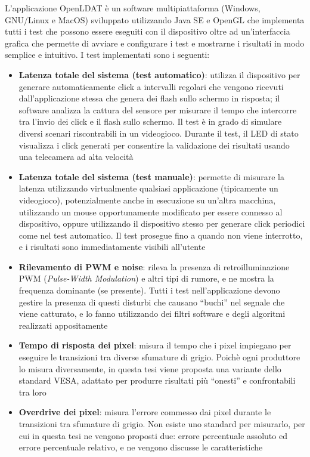 \documentclass[a4paper]{article}
\begin{document}
L'applicazione OpenLDAT è un software multipiattaforma (Windows, GNU/Linux e MacOS) sviluppato utilizzando Java SE e OpenGL che implementa tutti i test che possono essere eseguiti con il dispositivo oltre ad un'interfaccia grafica che permette di avviare e configurare i test e mostrarne i risultati in modo semplice e intuitivo. I test implementati sono i seguenti:\begin{itemize}
	\item \textbf{Latenza totale del sistema (test automatico)}: utilizza il dispositivo per generare automaticamente click a intervalli regolari che vengono ricevuti dall'applicazione stessa che genera dei flash sullo schermo in risposta; il software analizza la cattura del sensore per misurare il tempo che intercorre tra l'invio dei click e il flash sullo schermo. Il test è in grado di simulare diversi scenari riscontrabili in un videogioco. Durante il test, il LED di stato visualizza i click generati per consentire la validazione dei risultati usando una telecamera ad alta velocità
	\item \textbf{Latenza totale del sistema (test manuale)}: permette di misurare la latenza utilizzando virtualmente qualsiasi applicazione (tipicamente un videogioco), potenzialmente anche in esecuzione su un'altra macchina, utilizzando un mouse opportunamente modificato per essere connesso al dispositivo, oppure utilizzando il dispositivo stesso per generare click periodici come nel test automatico. Il test prosegue fino a quando non viene interrotto, e i risultati sono immediatamente visibili all'utente
	\item \textbf{Rilevamento di PWM e noise}: rileva la presenza di retroilluminazione PWM (\textit{Pulse-Width Modulation}) e altri tipi di rumore, e ne mostra la frequenza dominante (se presente). Tutti i test nell'applicazione devono gestire la presenza di questi disturbi che causano ``buchi'' nel segnale che viene catturato, e lo fanno utilizzando dei filtri software e degli algoritmi realizzati appositamente
	\item \textbf{Tempo di risposta dei pixel}: misura il tempo che i pixel impiegano per eseguire le transizioni tra diverse sfumature di grigio. Poichè ogni produttore lo misura diversamente, in questa tesi viene proposta una variante dello standard VESA, adattato per produrre risultati più ``onesti'' e confrontabili tra loro
	\item \textbf{Overdrive dei pixel}: misura l'errore commesso dai pixel durante le transizioni tra sfumature di grigio. Non esiste uno standard per misurarlo, per cui in questa tesi ne vengono proposti due: errore percentuale assoluto ed errore percentuale relativo, e ne vengono discusse le caratteristiche

\end{itemize}
\end{document}
